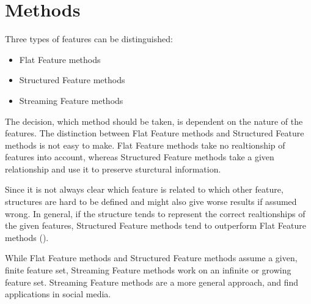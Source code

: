 \section{Methods}
\label{sec:methods}


Three types of features can be distinguished: 
\begin{itemize}
  \item Flat Feature methods
  \item Structured Feature methods
  \item Streaming Feature methods
\end{itemize}

The decision, which method should be taken, is dependent on the nature of the
features. The distinction between Flat Feature methods and Structured Feature
methods is not easy to make. Flat Feature methods take no realtionship of
features into account, whereas Structured Feature methods take a given
relationship and use it to preserve sturctural information.

Since it is not always clear which feature is related to which other feature,
structures are hard to be defined and might also give worse results if assumed
wrong. In general, if the structure tends to represent the correct realtionships
of the given features, Structured Feature methods tend to outperform Flat
Feature methods (\cite{Tang:14}).

While Flat Feature methods and Structured Feature methods assume a given, finite
feature set, Streaming Feature methods work on an infinite or growing feature
set. Streaming Feature methods are a more general approach, and find
applications in social media.





	
